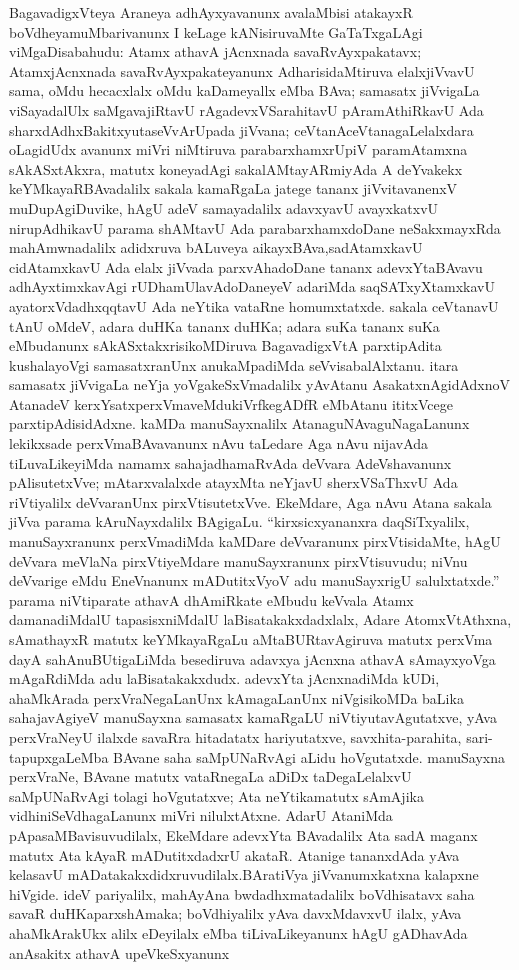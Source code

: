 BagavadigxVteya Araneya adhAyxyavanunx avalaMbisi atakayxR boVdheya\break muMba\-rivanunx I keLage kANisiruvaMte GaTaTxgaLAgi viMgaDisabahudu: Atamx athavA jAcnxnada savaRvAyxpakatavx; AtamxjAcnxnada savaRvAyxpakateyanunx AdharisidaMtiruva elalx\break jiVvavU sama, oMdu hecacxlalx oMdu kaDameyallx eMba BAva; samasatx jiVvigaLa viSaya\-dalUlx saMgavajiRtavU rAgadevxVSarahitavU pAramAthiRkavU Ada sharxdAdhxBakitxyuta\break seVvA\-rUpada jiVvana; ceVtanAceVtanagaLelalxdara oLagidUdx avanunx miVri niMtiruva parabarxhamxrUpiV paramAtamxna sAkASxtAkxra, matutx koneyadAgi sakalAMtayARmiyAda A deYvakekx keYMkayaRBAvadalilx sakala kamaRgaLa jatege tananx jiVvitavanenxV muDupAgiDu\-vike, hAgU adeV samayadalilx adavxyavU avayxkatxvU nirupAdhikavU parama shAMtavU Ada parabarxhamxdoDane neSakxmayxRda mahAmwnadalilx adidxruva bALuveya aikayxBAva,\break sadAtamxkavU cidAtamxkavU Ada elalx jiVvada parxvAhadoDane tananx adevxYtaBAvavu adhAyx\-timxkavAgi rUDhamUlavAdoDaneyeV adariMda saqSATxyXtamxkavU ayatorxVdadhxqqtavU Ada neYtika vataRne homumxtatxde. sakala ceVtanavU tAnU oMdeV, adara duHKa tananx duHKa; adara suKa tananx suKa eMbudanunx sAkASxtakxrisikoMDiruva BagavadigxVtA parxtipAdita kushalayoVgi samasatxranUnx anukaMpadiMda seVvisabalAlxtanu. itara samasatx jiVvi\-gaLa neYja yoVgakeSxVmadalilx yAvAtanu AsakatxnAgidAdxnoV AtanadeV kerxYsatxperxVmaveMdu\break kiVrfkegADfR eMbAtanu ititxVcege parxtipAdisidAdxne. kaMDa manuSayxnalilx Atana\break guNAva\-guNagaLanunx lekikxsade perxVmaBAvavanunx nAvu taLedare Aga nAvu nijavAda tiLu\-vaLikeyiMda namamx sahajadhamaRvAda deVvara AdeVshavanunx pAlisutetxVve; mAtarxvalalxde atayxMta neYjavU sherxVSaThxvU Ada riVtiyalilx deVvaranUnx pirxVtisutetxVve. EkeMdare, Aga nAvu Atana sakala jiVva parama kAruNayxdalilx BAgigaLu. ``kirxsicxyananxra daqSiTxyalilx, manu\-Sayxranunx perxVmadiMda kaMDare deVvaranunx pirxVtisidaMte, hAgU deVvara meVlaNa pirxVtiyeMdare manuSayxranunx pirxVtisuvudu; niVnu deVvarige eMdu EneVnanunx mADutitxVyoV adu manuSayxrigU salulxtatxde.'' parama niVtiparate athavA dhAmiRkate eMbudu keVvala Atamx damanadiMdalU tapasisxniMdalU laBisatakakxdadxlalx, Adare AtomxVtAthxna, \hbox{sAmathayxR} matutx keYMkayaRgaLu aMtaBURtavAgiruva matutx perxVma dayA sahAnuBUtigaLiMda besediruva adavxya jAcnxna athavA sAmayxyoVga mAgaRdiMda adu laBisa\-takakxdudx. adevxYta jAcnxnadiMda kUDi, ahaMkArada perxVraNegaLanUnx kAmagaLanUnx niVgisi\-koMDa baLika sahajavAgiyeV manuSayxna samasatx kamaRgaLU niVtiyutavAgutatxve, yAva perxVraNeyU ilalxde savaRra hitadatatx hariyutatxve, savxhita-parahita, sari-tapupx\-gaLeMba BAvane saha saMpUNaRvAgi aLidu hoVgutatxde. manuSayxna perxVraNe, BAvane matutx vataRnegaLa aDiDx taDegaLelalxvU saMpUNaRvAgi tolagi hoVgutatxve; Ata neYtika\break matutx sAmAjika vidhiniSeVdhagaLanunx miVri nilulxtAtxne. AdarU AtaniMda pApa\break saMBavisuvudilalx, EkeMdare adevxYta BAvadalilx Ata sadA maganx matutx Ata kAyaR mADutitxdadxrU akataR. Atanige tananxdAda yAva kelasavU mADatakakxdidxruvudilalx.\break BAra\-tiVya jiVvanumxkatxna kalapxne hiVgide. ideV pariyalilx, mahAyAna bwdadhxmatadalilx boVdhisatavx saha savaR duHKaparxshAmaka; boVdhiyalilx yAva davxMdavxvU ilalx, yAva ahaMkArakUkx alilx eDeyilalx eMba tiLivaLikeyanunx hAgU gADhavAda anAsakitx athavA upeVkeSxyanunx 